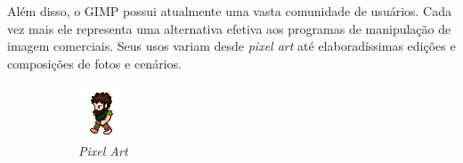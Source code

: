 \documentclass[12pt,onecolumn]{article}
\begin{document}
  Além disso, o GIMP possui atualmente uma vasta comunidade de usuários. Cada
  vez mais ele representa uma alternativa efetiva aos programas de manipulação
  de imagem comerciais. Seus usos variam desde {\it pixel art} até
  elaboradíssimas edições e composições de fotos e cenários.
  
  \vspace{50pt}
  
  \begin{figure}[ht]
    \centering
    \begin{subfigure}{.5\textwidth}
      \centering
      \includegraphics[width=.7\linewidth]{screenshots/00-pixel_art.png}
      \caption{
        \footnotesize
        \it
        Pixel Art
      }
      \label{fig:pixelart}
    \end{subfigure}%
    \begin{subfigure}{.5\textwidth}
      \centering

\end{subfigure}
\end{figure}
\end{document}
